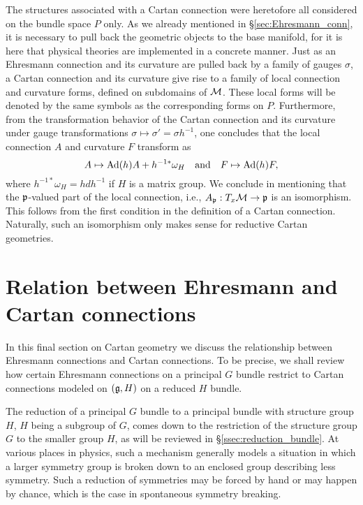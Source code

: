 \documentclass[
final,
11pt,
a4paper,
DIV=11,
headinclude=true,
footinclude=false,
bibliography=totoc,
twoside=true,  %
BCOR=5mm
]{scrbook}
\begin{document}
The structures associated with a Cartan connection were 
heretofore all considered on the bundle space $P$ only. As we 
already mentioned in \S\ref{sec:Ehresmann_conn}, it is necessary 
to pull back the geometric objects to the base manifold, for it 
is here that physical theories are implemented in a concrete 
manner. Just as an Ehresmann connection and its curvature are 
pulled back by a family of gauges $\sigma$, a Cartan connection 
and its curvature give rise to a family of local connection and 
curvature forms, defined on subdomains of $\mathcal{M}$. These local 
forms will be denoted by the same symbols as the corresponding 
forms on $P$.  Furthermore, from the transformation behavior of 
the Cartan connection and its curvature under gauge 
transformations $\sigma \mapsto \sigma' = \sigma h^{-1}$, one 
concludes that the local connection $A$ and curvature $F$ 
transform as
\begin{equation}
\label{eq:trafoLocalCartanConnCurv}
  A \mapsto \operatorname{Ad}(h) A + h^{-1*}\omega_H
  \quad\text{and}\quad
  F \mapsto \operatorname{Ad}(h) F,
\end{equation}
where $h^{-1*}\omega_H = hdh^{-1}$ if $H$ is a matrix group. We 
conclude in mentioning that the $\mathfrak{p}$-valued part of the local 
connection, i.e., $A_\mathfrak{p} : T_x \mathcal{M} \to \mathfrak{p}$ is an 
isomorphism. This follows from the first condition in the 
definition of a Cartan connection. Naturally, such an isomorphism 
only makes sense for reductive Cartan geometries.


\section{Relation between Ehresmann and Cartan connections}
\label{sec:relEhrCartConns}

In this final section on Cartan geometry we discuss the 
relationship between Ehresmann connections and Cartan 
connections.  To be precise, we shall review how certain 
Ehresmann connections on a principal $G$ bundle restrict to 
Cartan connections modeled on $(\mathfrak{g},H)$ on a reduced $H$ 
bundle.

The reduction of a principal $G$ bundle to a principal bundle 
with structure group $H$, $H$ being a subgroup of $G$, comes down 
to the restriction of the structure group $G$ to the smaller 
group $H$, as will be reviewed in \S\ref{ssec:reduction_bundle}.  
At various places in physics, such a mechanism generally models 
a situation in which a larger symmetry group is broken down to an 
enclosed group describing less symmetry. Such a reduction of 
symmetries may be forced by hand or may happen by chance, which 
is the case in spontaneous symmetry breaking.
\end{document}
